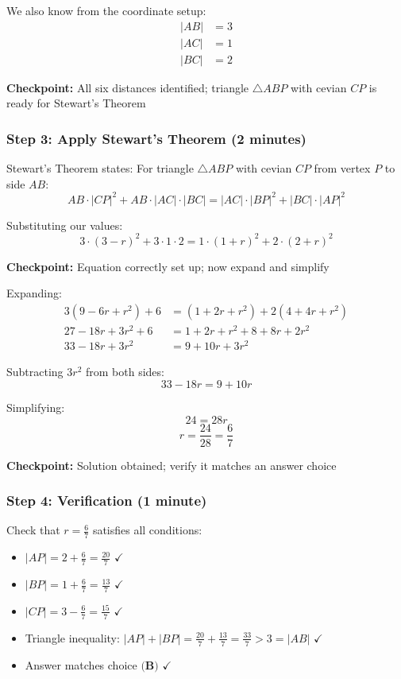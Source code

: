 \documentclass[]{article}
\begin{document}
\begin{solutionbox}
We also know from the coordinate setup:
\begin{align*}
|AB| &= 3\\
|AC| &= 1\\
|BC| &= 2
\end{align*}

\textbf{Checkpoint:} All six distances identified; triangle $\triangle ABP$ with cevian $CP$ is ready for Stewart's Theorem

\subsubsection*{Step 3: Apply Stewart's Theorem (2 minutes)}
Stewart's Theorem states: For triangle $\triangle ABP$ with cevian $CP$ from vertex $P$ to side $AB$:
\[AB \cdot |CP|^2 + AB \cdot |AC| \cdot |BC| = |AC| \cdot |BP|^2 + |BC| \cdot |AP|^2\]

Substituting our values:
\[3 \cdot (3-r)^2 + 3 \cdot 1 \cdot 2 = 1 \cdot (1+r)^2 + 2 \cdot (2+r)^2\]

\textbf{Checkpoint:} Equation correctly set up; now expand and simplify

Expanding:
\begin{align*}
3(9 - 6r + r^2) + 6 &= (1 + 2r + r^2) + 2(4 + 4r + r^2)\\
27 - 18r + 3r^2 + 6 &= 1 + 2r + r^2 + 8 + 8r + 2r^2\\
33 - 18r + 3r^2 &= 9 + 10r + 3r^2
\end{align*}

Subtracting $3r^2$ from both sides:
\[33 - 18r = 9 + 10r\]

Simplifying:
\[24 = 28r\]
\[r = \frac{24}{28} = \frac{6}{7}\]

\textbf{Checkpoint:} Solution obtained; verify it matches an answer choice

\subsubsection*{Step 4: Verification (1 minute)}
Check that $r = \frac{6}{7}$ satisfies all conditions:
\begin{itemize}[leftmargin=*]
    \item $|AP| = 2 + \frac{6}{7} = \frac{20}{7}$ $\checkmark$
    \item $|BP| = 1 + \frac{6}{7} = \frac{13}{7}$ $\checkmark$
    \item $|CP| = 3 - \frac{6}{7} = \frac{15}{7}$ $\checkmark$
    \item Triangle inequality: $|AP| + |BP| = \frac{20}{7} + \frac{13}{7} = \frac{33}{7} > 3 = |AB|$ $\checkmark$
    \item Answer matches choice $\textbf{(B)}$ $\checkmark$
\end{itemize}


\end{solutionbox}
\end{document}
